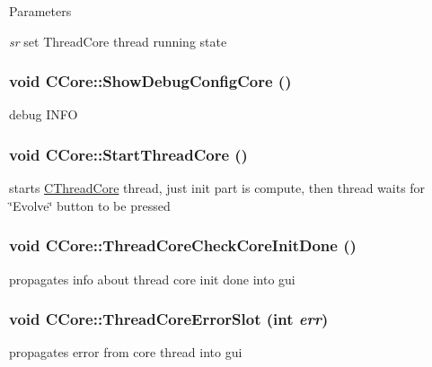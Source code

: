 \begin{DoxyParams}{Parameters}
\item[{\em sr}]set ThreadCore thread running state \end{DoxyParams}
\hypertarget{classCCore_ae836cfc9a5b1d30a093cc92c7e0f825b}{
\subsubsection[{ShowDebugConfigCore}]{\setlength{\rightskip}{0pt plus 5cm}void CCore::ShowDebugConfigCore ()}}
\label{classCCore_ae836cfc9a5b1d30a093cc92c7e0f825b}
debug INFO \hypertarget{classCCore_ab23cb1edf937f04342dfbbc7c2e1e45a}{
\subsubsection[{StartThreadCore}]{\setlength{\rightskip}{0pt plus 5cm}void CCore::StartThreadCore ()}}
\label{classCCore_ab23cb1edf937f04342dfbbc7c2e1e45a}
starts \hyperlink{classCThreadCore}{CThreadCore} thread, just init part is compute, then thread waits for \char`\"{}Evolve\char`\"{} button to be pressed \hypertarget{classCCore_a201541672b99640948959c4022f8cda4}{
\subsubsection[{ThreadCoreCheckCoreInitDone}]{\setlength{\rightskip}{0pt plus 5cm}void CCore::ThreadCoreCheckCoreInitDone ()}}
\label{classCCore_a201541672b99640948959c4022f8cda4}
propagates info about thread core init done into gui \hypertarget{classCCore_a8da26ce21ea70fb3c31978e6d2fce17e}{
\subsubsection[{ThreadCoreErrorSlot}]{\setlength{\rightskip}{0pt plus 5cm}void CCore::ThreadCoreErrorSlot (int {\em err})}}
\label{classCCore_a8da26ce21ea70fb3c31978e6d2fce17e}
propagates error from core thread into gui


